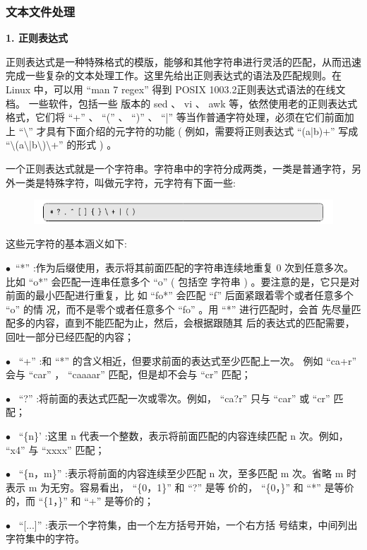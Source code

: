 \documentclass[12pt，a4paper]{article}
\numberwithin{equation}{section}
\begin{document}
\subsubsection{文本文件处理}
\textbf{1. 正则表达式}

正则表达式是一种特殊格式的模版，能够和其他字符串进行灵活的匹配，从而迅速完成一些复杂的文本处理工作。这里先给出正则表达式的语法及匹配规则。在 Linux 中，可以用 “man 7 regex” 得到 POSIX 1003.2正则表达式语法的在线文档。
一些软件，包括一些
版本的 sed 、 vi 、 awk 等，依然使用老的正则表达式格式，它们将
“+” 、 “(” 、 “)” 、 “|” 等当作普通字符处理，必须在它们前面加上 “$\setminus$”
才具有下面介绍的元字符的功能 ( 例如，需要将正则表达式 “(a|b)+”
写成 “$\setminus$(a$\setminus$|b$\setminus$)$\setminus$+” 的形式 ) 。

一个正则表达式就是一个字符串。字符串中的字符分成两类，一类是普通字符，另外一类是特殊字符，叫做元字符，元字符有下面一些:
\begin{figure}[H]
\centering
\includegraphics[scale=0.6]{./figures/280.png}
\end{figure}
这些元字符的基本涵义如下:

$\bullet$~“*” :作为后缀使用，表示将其前面匹配的字符串连续地重复 0
次到任意多次。比如 “o*” 会匹配一连串任意多个 “o” ( 包括空
字符串 ) 。要注意的是，它只是对前面的最小匹配进行重复，比
如 “fo*” 会匹配 “f” 后面紧跟着零个或者任意多个 “o” 的情
况，而不是零个或者任意多个 “fo” 。用 “*” 进行匹配时，会首
先尽量匹配多的内容，直到不能匹配为止，然后，会根据跟随其
后的表达式的匹配需要，回吐一部分已经匹配的内容；

$\bullet$~ “+” :和 “*” 的含义相近，但要求前面的表达式至少匹配上一次。
例如 “ca+r” 会与 “car” ， “caaaar” 匹配，但是却不会与 “cr”
匹配；

$\bullet$~ “?” :将前面的表达式匹配一次或零次。例如， “ca?r” 只与 “car”
或 “cr” 匹配；

$\bullet$~ “\{n\}’ :这里 n 代表一个整数，表示将前面匹配的内容连续匹配
n 次。例如， “x{4}” 与 “xxxx” 匹配；

$\bullet$~ “\{n，m\}” :表示将前面的内容连续至少匹配 n 次，至多匹配 m
次。省略 m 时表示 m 为无穷。容易看出， “\{0，1\}” 和 “?” 是等
价的， “\{0，\}” 和 “*” 是等价的，而 “\{1，\}” 和 “+” 是等价的；

$\bullet$~ “[...]” :表示一个字符集，由一个左方括号开始，一个右方括
号结束，中间列出字符集中的字符。
\end{document}
